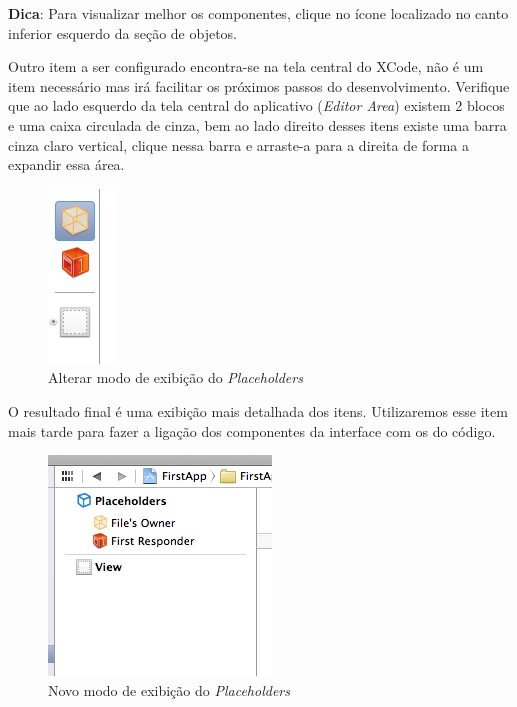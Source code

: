 \documentclass[a4paper,12pt,brazil,doubleside]{book}
\begin{document}
\begin{singlespace}
\begin{framed}

\textbf{Dica}: Para visualizar melhor os componentes, clique no ícone localizado no canto inferior esquerdo da seção de objetos.
\end{framed}

Outro item a ser configurado encontra-se na tela central do XCode, não é um item necessário mas irá facilitar os próximos passos do desenvolvimento. Verifique que ao lado esquerdo da tela central do aplicativo (\emph{Editor Area}) existem 2 blocos e uma caixa circulada de cinza, bem ao lado direito desses itens existe uma barra cinza claro vertical, clique nessa barra e arraste-a para a direita de forma a expandir essa área.

\begin{figure}[H]
  \centering
  \includegraphics[scale=0.5]{figuras/3/tela_novo_projeto_14.png}
  \caption{Alterar modo de exibição do \emph{Placeholders}}
  \label{fig:a}
\end{figure}


O resultado final é uma exibição mais detalhada dos itens. Utilizaremos esse item mais tarde para fazer a ligação dos componentes da interface com os do código.

\begin{figure}[H]
  \centering
  \includegraphics[scale=0.7]{figuras/3/tela_novo_projeto_15.png}
  \caption{Novo modo de exibição do \emph{Placeholders}}
  \label{fig:a}
\end{figure}




\end{singlespace}
\end{document}
